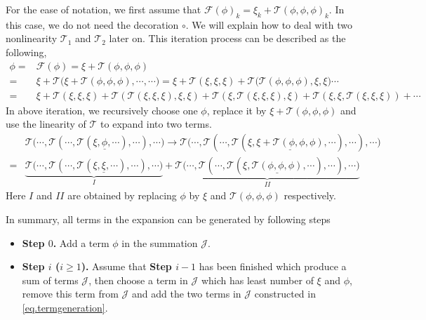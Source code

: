 For the ease of notation, we first assume that $\mathcal{F}(\phi)_k=\xi_k+\mathcal{T}(\phi,\phi,\phi)_k$.
In this case, we do not need the decoration $\circ$. We will explain how to deal with two nonlinearity $\mathcal{T}_1$ and $\mathcal{T}_2$ later on. This iteration process can be described as the following, 
\begin{equation*}
\begin{split}
    \phi=&\mathcal{F}(\phi)=\xi+\mathcal{T}(\phi,\phi,\phi)
    \\
    =&\xi+\mathcal{T}\Big(\xi+\mathcal{T}(\phi,\phi,\phi),
    \cdots,
    \cdots\Big)=\xi+\mathcal{T}(\xi,\xi,\xi)+\mathcal{T}\Big(\mathcal{T}(\phi,\phi,\phi),
    \xi,
    \xi\Big)\cdots
    \\
    =&\xi+\mathcal{T}(\xi,\xi,\xi)+\mathcal{T}(\mathcal{T}(\xi,\xi,\xi),\xi,\xi)
    +\mathcal{T}(\xi,\mathcal{T}(\xi,\xi,\xi),\xi)
    +\mathcal{T}(\xi,\xi,\mathcal{T}(\xi,\xi,\xi))+\cdots
\end{split}    
\end{equation*}
In above iteration, we recursively choose one $\phi$, replace it by $\xi+\mathcal{T}(\phi,\phi,\phi)$ and use the linearity of $\mathcal{T}$ to expand into two terms.
\begin{equation}\label{eq.termgeneration}
\begin{split}
    &\mathcal{T}\Big(\cdots,\mathcal{T}(\cdots,\mathcal{T}(\xi,\underline{\phi},\cdots),\cdots),\cdots\Big)\rightarrow \mathcal{T}\Big(\cdots,\mathcal{T}(\cdots,\mathcal{T}(\xi,\underline{\xi+\mathcal{T}(\phi,\phi,\phi)},\cdots),\cdots),\cdots\Big)
    \\
    =& \underbrace{\mathcal{T}\Big(\cdots,\mathcal{T}(\cdots,\mathcal{T}(\xi,\underline{\xi},\cdots),\cdots),\cdots\Big)}_{I}
    +\underbrace{\mathcal{T}\Big(\cdots,\mathcal{T}(\cdots,\mathcal{T}(\xi,\underline{\mathcal{T}(\phi,\phi,\phi)},\cdots),\cdots),\cdots\Big)}_{II}
\end{split}        
\end{equation}
Here $I$ and $II$ are obtained by replacing $\phi$ by $\xi$ and $\mathcal{T}(\phi,\phi,\phi)$ respectively.

In summary, all terms in the expansion can be generated by following steps

\begin{itemize}
    \item \textbf{Step $0$.} Add a term $\phi$ in the summation $\mathcal{J}$.
    \item \textbf{Step $i$ ($i\ge 1$).} Assume that \textbf{Step $i-1$} has been finished which produce a sum of terms $\mathcal{J}$, then choose a term in $\mathcal{J}$ which has least number of $\xi$ and $\phi$, remove this term from $\mathcal{J}$ and add the two terms in $\mathcal{J}$ constructed in \eqref{eq.termgeneration}.
\end{itemize}

